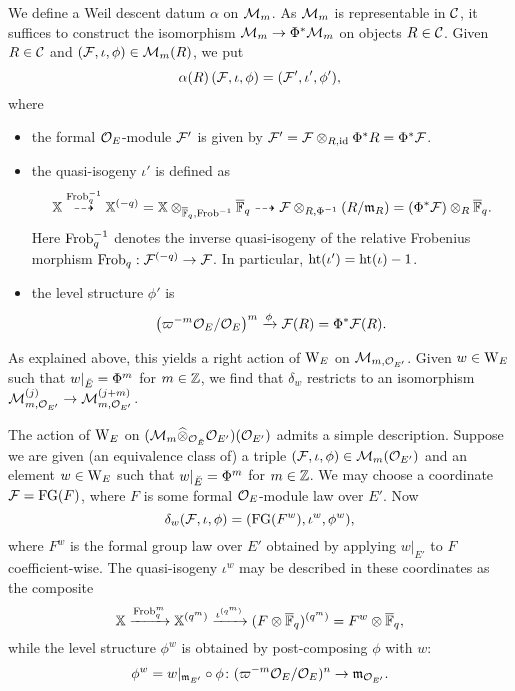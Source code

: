 \documentclass[../main.tex]{subfiles}
\begin{document}
We define a Weil descent datum $\alpha$ on $\mathcal{M}_m$. As $\mathcal{M}_m$ is representable
in $\mathcal{C}$, it suffices to construct the isomorphism
$\mathcal{M}_m \to \Phi^* \mathcal{M}_m$ on objects $R \in \mathcal{C}$. 
Given $R\in \mathcal{C}$ and $(\mathcal{F}, \iota, \phi) \in \mathcal{M}_m(R)$, we put
\begin{equation*}
  \alpha(R) \left( \mathcal{F}, \iota, \phi \right) = (\mathcal{F}', \iota',\phi'),
\end{equation*}
where
\begin{itemize}
  \item the formal $\mathcal{O}_E$-module $\mathcal{F}'$ is given by $\mathcal{F}' = \mathcal{F} \otimes_{R, \operatorname{id}}
    \Phi^* R = \Phi^* \mathcal{F}$.
  \item the quasi-isogeny $\iota'$ is defined as
    \begin{equation*}
      \mathbb{X} \overset{\mathrm{Frob}_q^{-1}}{\dashrightarrow} \mathbb{X}^{(-q)} = \mathbb{X}
      \otimes_{\overline {\mathbb{F}}_q, \mathrm{Frob}^{-1}}
      {\overline {\mathbb{F}}_q} \dashrightarrow \mathcal{F} \otimes_{R, \Phi^{-1}} (R/\mathfrak{m}_R) = (\Phi^*
      \mathcal{F}) \otimes_R {\overline {\mathbb{F}}_q}.
    \end{equation*}
    Here $\mathrm{Frob}_q^{-1}$ denotes the inverse quasi-isogeny of the relative
    Frobenius morphism $\mathrm{Frob}_q: \mathcal{F}^{(-q)} \to \mathcal{F}$. In particular, 
    $\textnormal{ht}(\iota') = \textnormal{ht}(\iota)-1$.
  \item the level structure $\phi'$ is
    \begin{equation*}
      \left({\varpi^{-m}\mathcal{O}_E}/{\mathcal{O}_E} \right)^m      
       \xrightarrow{\phi} \mathcal{F}(R) = \Phi^* \mathcal{F}(R).
    \end{equation*}
\end{itemize}

As explained above, this yields a right action of $\mathrm W_E$ on $\mathcal{M}_{m, \mathcal{O}_{{E'}}}$.
Given $w \in \mathrm W_E$ such that $w|_{\breve {E}} = \Phi^m$ for $m \in \mathbb{Z}$, we find
that $\delta_w$ restricts to an isomorphism $\mathcal{M}_{m, \mathcal{O}_{{E'}}}^{(j)} \to \mathcal{M}_{m,
\mathcal{O}_{{E'}}}^{(j+m)}$. 

\begin{xpl}
  The action of $\mathrm W_E$ on 
  $(\mathcal{M}_{m}\widehat \otimes_{\mathcal{O}_{\breve {E}}} \mathcal{O}_{E'})({\mathcal{O}_{E'}})$ admits a simple description.
  Suppose we are given (an equivalence class of)
  a triple $(\mathcal{F}, \iota, \phi) \in \mathcal{M}_m({\mathcal{O}_{E'}})$ 
  and an element $w \in \mathrm W_E$ such that 
  $w|_{{\breve {E}}} = \Phi^m$ for $m \in \mathbb{Z}$. We may choose a coordinate
  $\mathcal{F} = \textnormal{FG}(F)$, where $F$ is some formal $\mathcal{O}_E$-module law over $E'$. Now
  $$\delta_w(\mathcal{F}, \iota, \phi) = (\textnormal{FG}(F^w), \iota^w, \phi^w),$$ 
  where $F^w$ is the formal group law over $E'$ obtained by applying 
  $w|_{E'}$ to $F$ coefficient-wise. The quasi-isogeny $\iota^w$ may be
  described in these coordinates as the composite
  $$ \mathbb{X} \xrightarrow{\mathrm{Frob}_q^m} \mathbb{X}^{(q^m)} \xrightarrow{\iota^{(q^m)}} (F \otimes
  {\overline{\mathbb{F}}_q})^{(q^m)} = F^w \otimes {\overline{\mathbb{F}}_q},$$
  while the level structure $\phi^w$ is obtained by post-composing $\phi$ with $w$:
  $$\phi^w = w|_{\mathfrak{m}_{E'}} \circ \phi \colon (\varpi^{-m}\mathcal{O}_E/\mathcal{O}_E)^n 
  \to \mathfrak{m}_{\mathcal{O}_{E'}}.$$
\end{xpl}
\end{document}
